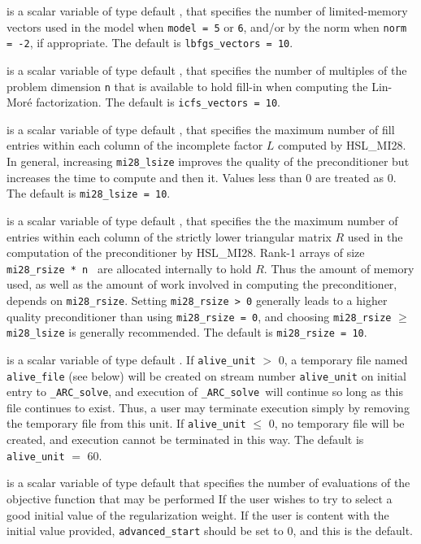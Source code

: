 \documentclass{galahad}
\newcommand{\packagename}{ARC}
\newcommand{\fullpackagename}{\libraryname\_\packagename}
\newcommand{\solver}{{\tt \fullpackagename\_solve}}
\begin{document}
\begin{description}
 is a scalar variable of type default \integer,
that specifies the number of limited-memory vectors used in the model
when {\tt model = 5} or {\tt 6},
and/or by the norm when {\tt norm = -2},
if appropriate.
The default is {\tt lbfgs\_vectors = 10}.

 is a scalar variable of type default \integer,
that specifies the number of multiples of the problem dimension {\tt n}
that is available to hold fill-in when computing the Lin-Mor\'{e}
factorization.
The default is {\tt icfs\_vectors = 10}.

 is a scalar variable of type default \integer,
that specifies the maximum number of fill entries within each column
of the incomplete factor $L$ computed by HSL\_MI28. In general,
increasing {\tt mi28\_lsize} improves the quality of the preconditioner
but increases the time to compute and then it. Values less than 0 are
treated as 0.
The default is {\tt mi28\_lsize = 10}.

 is a scalar variable of type default \integer,
that specifies the the maximum number of entries within each column of the
strictly lower triangular matrix $R$ used in the computation of the
preconditioner by HSL\_MI28.  Rank-1 arrays of size {\tt mi28\_rsize * n }
are allocated internally to hold $R$. Thus the amount of memory used, as well
as the amount of work involved in computing the preconditioner, depends on
{\tt mi28\_rsize}. Setting {\tt mi28\_rsize > 0} generally leads to a
higher quality preconditioner than using {\tt mi28\_rsize = 0}, and
choosing {\tt mi28\_rsize} $\geq$ {\tt mi28\_lsize} is generally
recommended.
The default is {\tt mi28\_rsize = 10}.


 is a scalar variable of type default \integer.
If {\tt alive\_unit} $>$ 0, a temporary file named {\tt alive\_file} (see below)
will be created on stream number {\tt alive\_unit} on initial entry to
\solver, and execution of \solver\ will continue so
long as this file continues to exist. Thus, a user may terminate execution
simply by removing the temporary file from this unit.
If {\tt alive\_unit} $\leq$ 0, no temporary file will be created, and
execution cannot be terminated in this way.
The default is {\tt alive\_unit} $=$ 60.

 is a scalar variable of type default \integer that
specifies the number of evaluations of the objective function that may
be performed If the user wishes to try to select a good initial value of the
regularization weight. If the user is content with the initial value provided,
{\tt advanced\_start} should be set to 0, and this is the default.


\end{description}
\end{document}
